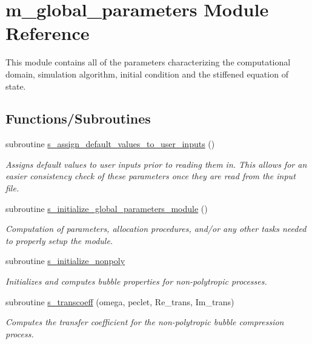 \hypertarget{namespacem__global__parameters}{}\section{m\+\_\+global\+\_\+parameters Module Reference}
\label{namespacem__global__parameters}


This module contains all of the parameters characterizing the computational domain, simulation algorithm, initial condition and the stiffened equation of state.  


\subsection*{Functions/\+Subroutines}
\begin{DoxyCompactItemize}
\item 
subroutine \hyperlink{namespacem__global__parameters_a433eac37597eb46a3cac84ca0471f5d3}{s\+\_\+assign\+\_\+default\+\_\+values\+\_\+to\+\_\+user\+\_\+inputs} ()
\begin{DoxyCompactList}\small\item\em Assigns default values to user inputs prior to reading them in. This allows for an easier consistency check of these parameters once they are read from the input file. \end{DoxyCompactList}\item 
subroutine \hyperlink{namespacem__global__parameters_a8a76198d180cb9736c21dde108cb0dbf}{s\+\_\+initialize\+\_\+global\+\_\+parameters\+\_\+module} ()
\begin{DoxyCompactList}\small\item\em Computation of parameters, allocation procedures, and/or any other tasks needed to properly setup the module. \end{DoxyCompactList}\item 
subroutine \hyperlink{namespacem__global__parameters_a1611e2cf82243c04b04a11281ef67993}{s\+\_\+initialize\+\_\+nonpoly}
\begin{DoxyCompactList}\small\item\em Initializes and computes bubble properties for non-\/polytropic processes. \end{DoxyCompactList}\item 
subroutine \hyperlink{namespacem__global__parameters_af52b102f1c17e28aa4ca3070f8806ca6}{s\+\_\+transcoeff} (omega, peclet, Re\+\_\+trans, Im\+\_\+trans)
\begin{DoxyCompactList}\small\item\em Computes the transfer coefficient for the non-\/polytropic bubble compression process. \end{DoxyCompactList}\item 

\end{DoxyCompactItemize}
